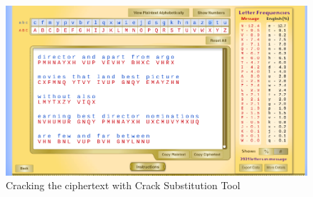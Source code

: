 \documentclass[12pt]{article}
\begin{document}
\begin{figure}[!ht]
    \begin{center}
        \includegraphics[scale=0.48]{c21.png}
    \end{center}{}
    \caption{Cracking the ciphertext with Crack Substitution Tool}
    \label{fig:c21}
\end{figure}
\end{document}
